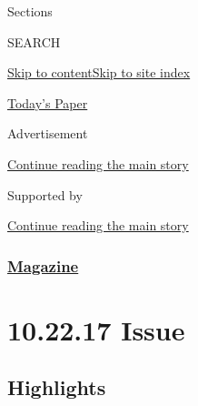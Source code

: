 Sections

SEARCH

\protect\hyperlink{site-content}{Skip to
content}\protect\hyperlink{site-index}{Skip to site index}

\href{https://myaccount.nytimes3xbfgragh.onion/auth/login?response_type=cookie\&client_id=vi}{}

\href{https://www.nytimes3xbfgragh.onion/section/todayspaper}{Today's
Paper}

Advertisement

\protect\hyperlink{after-top}{Continue reading the main story}

Supported by

\protect\hyperlink{after-sponsor}{Continue reading the main story}

\hypertarget{magazine}{%
\subsubsection{\texorpdfstring{\href{/section/magazine}{Magazine}}{Magazine}}\label{magazine}}

\hypertarget{102217-issue}{%
\section{10.22.17 Issue}\label{102217-issue}}

\hypertarget{highlights}{%
\subsection{Highlights}\label{highlights}}

